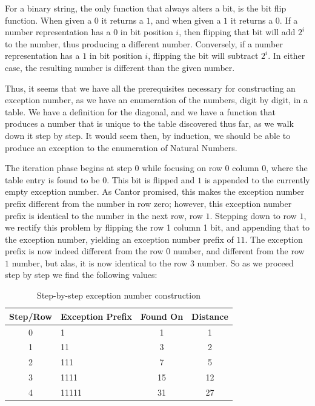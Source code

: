\documentclass{article}
\begin{document}
	For a binary string, the only function that always alters a bit, is the bit flip function.  When given a \(0\) it returns a \(1\), and when given a \(1\) it returns a \(0\). If a number representation has a \(0\) in bit position \( i \), then flipping that bit will add \( 2^i \) to the number, thus producing a different number. Conversely, if a number representation has a \( 1 \) in bit position \( i \), flipping the bit will subtract \( 2^i \). In either case, the resulting number is different than the given number.

	Thus, it seems that we have all the prerequisites necessary for constructing an exception number, as we have an enumeration of the numbers, digit by digit, in a table. We have a definition for the diagonal, and we have a function that produces a number that is unique to the table discovered thus far, as we walk down it step by step. It would seem then, by induction, we should be able to produce an exception to the enumeration of Natural Numbers. 
	
	The iteration phase begins at step \(0\) while focusing on row \(0\) column \(0\), where the table entry is found to be \(0\). This bit is flipped and \(1\) is appended to the currently empty exception number.  As Cantor promised, this makes the exception number prefix different from the number in row zero; however, this exception number prefix is identical to the number in the next row, row \(1\). Stepping down to row \(1\), we rectify this problem by flipping the row 1 column 1 bit, and appending that to the exception number, yielding an exception number prefix of \(11\). The exception prefix is now indeed different from the row \(0\) number, and different from the row \(1\) number, but alas, it is now identical to the row \(3\) number. So as we proceed step by step we find the following values:
	
	
	\begin{table}[H]
		\centering
		\begin{tabular}{c | l | c | c}
			\toprule
			Step/Row & Exception Prefix & Found On & Distance \\
			\midrule
			0    & 1   & 1  & 1  \\
			1    & 11  & 3  & 2  \\
			2    & 111 & 7  & 5  \\
			3    & 1111 & 15 & 12  \\
			4    & 11111 & 31 & 27  \\
			\bottomrule
		\end{tabular}
		\caption{Step-by-step exception number construction}
		\label{tab:exception_construction}
	\end{table} 
	
\end{document}
